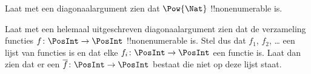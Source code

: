 \documentclass[../../../include/open-logic-section]{subfiles}
\begin{document}
\begin{prob}
Laat met een diagonaalargument zien dat $\Pow{\Nat}$
!!{nonenumerable} is.
\end{prob}

\begin{prob}\label{sfr:siz:nen:prob:f-posint}
Laat met een helemaal uitgeschreven diagonaalargument zien dat de
verzameling functies $f \colon \PosInt \to \PosInt$ !!{nonenumerable} is. Stel dus
dat $f_1$, $f_2$, \dots{} een lijst van functies is en dat elke
$f_i\colon \PosInt \to \PosInt$ een functie is. Laat dan zien dat er een
$\overline{f}\colon \PosInt \to \PosInt$ bestaat die niet op deze lijst
staat.
\end{prob}
\end{document}

